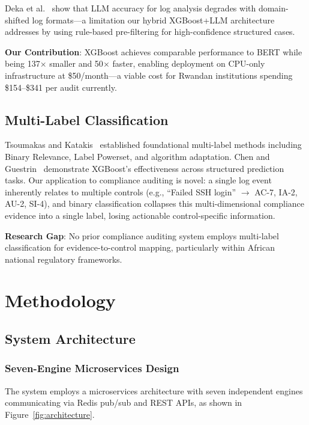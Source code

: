 \documentclass[futureinternet,article,submit,pdftex,moreauthors]{Definitions/mdpi}
\begin{document}
Deka et al.~\cite{deka2024} show that LLM accuracy for log analysis degrades with
domain-shifted log formats---a limitation our hybrid XGBoost+LLM architecture addresses by
using rule-based pre-filtering for high-confidence structured cases.

\textbf{Our Contribution}: XGBoost achieves comparable performance to BERT while being
137$\times$ smaller and 50$\times$ faster, enabling deployment on CPU-only infrastructure at
\$50/month---a viable cost for Rwandan institutions spending \$154--\$341 per audit currently.

\subsection{Multi-Label Classification}

Tsoumakas and Katakis~\cite{tsoumakas2007} established foundational multi-label methods
including Binary Relevance, Label Powerset, and algorithm adaptation. Chen and
Guestrin~\cite{chen2016xgboost} demonstrate XGBoost's effectiveness across structured
prediction tasks. Our application to compliance auditing is novel: a single log event
inherently relates to multiple controls (e.g., ``Failed SSH login'' $\rightarrow$ AC-7,
IA-2, AU-2, SI-4), and binary classification collapses this multi-dimensional compliance
evidence into a single label, losing actionable control-specific information.

\textbf{Research Gap}: No prior compliance auditing system employs multi-label classification
for evidence-to-control mapping, particularly within African national regulatory frameworks.

\section{Methodology}
\label{sec:method}

\subsection{System Architecture}

\subsubsection{Seven-Engine Microservices Design}

The system employs a microservices architecture with seven independent engines communicating
via Redis pub/sub and REST APIs, as shown in Figure~\ref{fig:architecture}.
\end{document}
